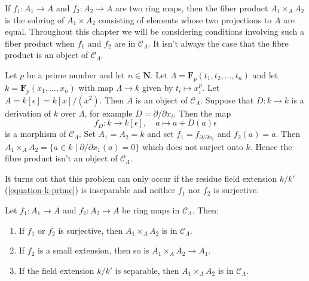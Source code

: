 \noindent
If $f_1: A_1 \to A$ and $f_2: A_2 \to A$ are two ring maps, then the fiber
product $A_1 \times_A A_2$ is the subring of $A_1 \times A_2$ consisting of
elements whose two projections to $A$ are equal. Throughout this chapter we
will be considering conditions involving such a fiber product when $f_1$
and $f_2$ are in $\mathcal{C}_\Lambda$. It isn't always the case that the
fibre product is an object of $\mathcal{C}_\Lambda$.

\begin{example}
\label{example-fibre-product}
Let $p$ be a prime number and let $n \in \mathbf{N}$.
Let $\Lambda = \mathbf{F}_p(t_1, t_2, \ldots, t_n)$ and let
$k = \mathbf{F}_p(x_1, \ldots, x_n)$ with map $\Lambda \to k$ given
by $t_i \mapsto x_i^p$. Let $A = k[\epsilon] = k[x]/(x^2)$.
Then $A$ is an object of $\mathcal{C}_\Lambda$. Suppose that
$D : k \to k$ is a derivation of $k$ over $\Lambda$, for example
$D = \partial/\partial x_i$. Then the map
$$
f_D : k \longrightarrow k[\epsilon], \quad
a \mapsto a + D(a)\epsilon
$$
is a morphism of $\mathcal{C}_\Lambda$. Set $A_1 = A_2 = k$ and set
$f_1 = f_{\partial/\partial x_1}$ and $f_2(a) = a$. Then
$A_1 \times_A A_2 = \{a \in k \mid \partial/\partial x_1(a) = 0\}$
which does not surject onto $k$. Hence the fibre product isn't
an object of $\mathcal{C}_\Lambda$.
\end{example}

\noindent
It turns out that this problem can only occur if the residue field
extension $k/k'$ (\ref{equation-k-prime}) is inseparable
and neither $f_1$ nor $f_2$ is surjective.

\begin{lemma}
\label{lemma-fiber-product-CLambda}
Let $f_1 : A_1 \to A$ and $f_2 : A_2 \to A$ be ring maps in
$\mathcal{C}_\Lambda$. Then:
\begin{enumerate}
\item If $f_1$ or $f_2$ is surjective, then
$A_1 \times_A A_2$ is in $\mathcal{C}_\Lambda$.
\item If $f_2$ is a small extension, then so is
$A_1 \times_A A_2 \to A_1$.
\item If the field extension $k/k'$ is separable, then
$A_1 \times_A A_2$ is in $\mathcal{C}_\Lambda$.
\end{enumerate}
\end{lemma}

